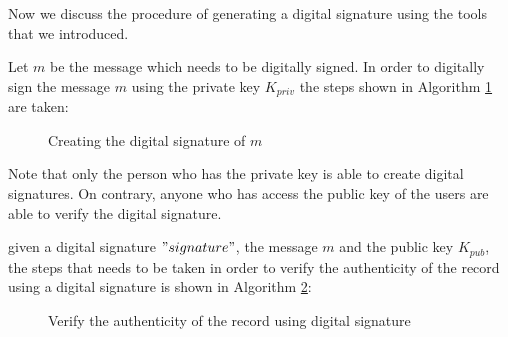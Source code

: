 		Now we discuss the procedure of generating a digital signature using the tools that we introduced.
		\begin{defn} 
			Let $m$ be the message which needs to be digitally signed. In order to digitally sign the message $m$ using the private key $K_{priv}$ the steps shown in Algorithm \ref{alg:digital_signing} are taken:
		\label{dfn:digital_signature}
		\end{defn}

		\begin{figure}[h]
			\begin{algorithm}[H]
				\SetAlgoLined
				\caption{Creating the digital signature of $m$}
				\SetAlCapNameFnt{\tiny}
				\label{alg:digital_signing}
				\DontPrintSemicolon
			\end{algorithm}
		\end{figure}

		Note that only the person who has the private key is able to create digital signatures. On contrary, anyone who has access the public key of the users are able to verify the digital signature.


		\begin{defn}
			given a digital signature $"signature"$, the message $m$ and the public key $K_{pub}$, the steps that needs to be taken in order to verify the authenticity of the record using a digital signature is shown in Algorithm \ref{alg:signature_verification}:
		\label{digital_signature_verification}
		\end{defn}

		\begin{figure}[h]
			\begin{algorithm}[H]
					\SetAlgoLined
					\caption{Verify the authenticity of the record using digital signature}
					\SetAlCapNameFnt{\tiny}
					\label{alg:signature_verification}
					\DontPrintSemicolon
			\end{algorithm}
		\end{figure}

